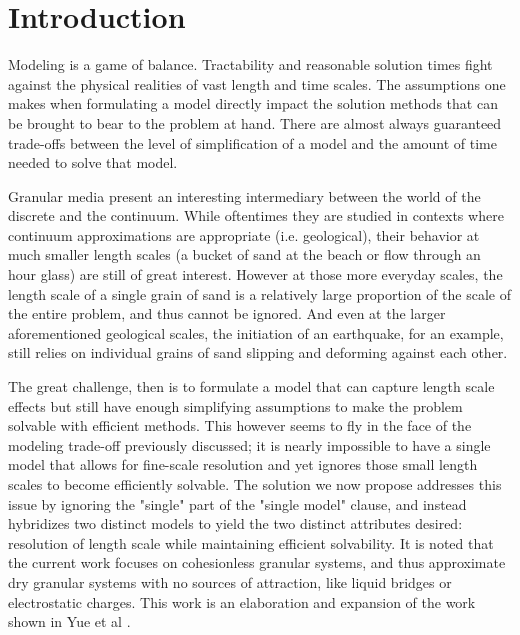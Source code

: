 \chapter{Introduction}

Modeling is a game of balance. Tractability and reasonable solution times fight against the physical realities of vast length and time scales. The assumptions one makes when formulating a model directly impact the solution methods that can be brought to bear to the problem at hand. There are almost always guaranteed trade-offs between the level of simplification of a model and the amount of time needed to solve that model.

Granular media present an interesting intermediary between the world of the discrete and the continuum. While oftentimes they are studied in contexts where continuum approximations are appropriate (i.e. geological), their behavior at much smaller length scales (a bucket of sand at the beach or flow through an hour glass) are still of great interest. However at those more everyday scales, the length scale of a single grain of sand is a relatively large proportion of the scale of the entire problem, and thus cannot be ignored. And even at the larger aforementioned geological scales, the initiation of an earthquake, for an example, still relies on individual grains of sand slipping and deforming against each other.

The great challenge, then is to formulate a model that can capture length scale effects but still have enough simplifying assumptions to make the problem solvable with efficient methods. This however seems to fly in the face of the modeling trade-off previously discussed; it is nearly impossible to have a single model that allows for fine-scale resolution and yet ignores those small length scales to become efficiently solvable. The solution we now propose addresses this issue by ignoring the "single" part of the "single model" clause, and instead hybridizes two distinct models to yield the two distinct attributes desired: resolution of length scale while maintaining efficient solvability. It is noted that the current work focuses on cohesionless granular systems, and thus approximate dry granular systems with no sources of attraction, like liquid bridges or electrostatic charges. This work is an elaboration and expansion of the work shown in Yue et al \cite{HG:2018}.


